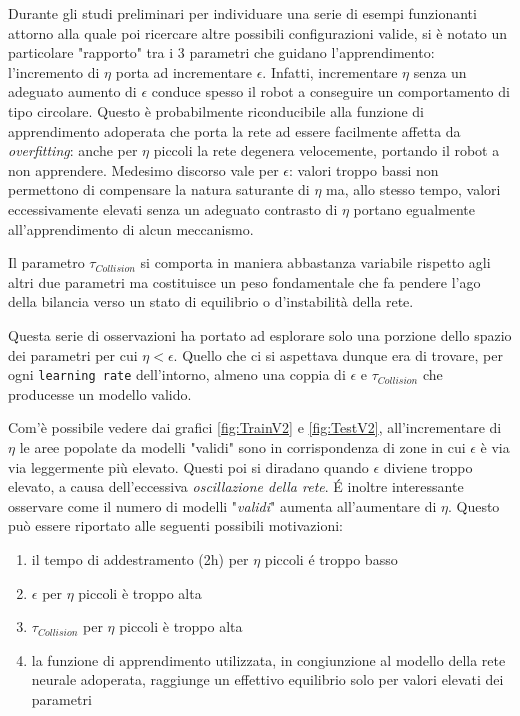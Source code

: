 Durante gli studi preliminari per individuare una serie di esempi funzionanti attorno alla quale poi ricercare altre possibili configurazioni valide, si è notato un particolare "rapporto" tra i 3 parametri che guidano l'apprendimento: l'incremento di $\eta$ porta ad incrementare $\epsilon$.
Infatti, incrementare $\eta$ senza un adeguato aumento di $\epsilon$ conduce spesso il robot a conseguire un comportamento di tipo circolare. Questo è probabilmente riconducibile alla funzione di apprendimento adoperata che porta la rete ad essere facilmente affetta da \textit{overfitting}: anche per $\eta$ piccoli la rete degenera velocemente, portando il robot a non apprendere. Medesimo discorso vale per $\epsilon$: valori troppo bassi non permettono di compensare la natura saturante di $\eta$ ma, allo stesso tempo, valori eccessivamente elevati senza un adeguato contrasto di $\eta$ portano egualmente all'apprendimento di alcun meccanismo.

Il parametro $\tau_{Collision}$ si comporta in maniera abbastanza variabile rispetto agli altri due parametri ma costituisce un peso fondamentale che fa pendere l'ago della bilancia verso un stato di equilibrio o d'instabilità della rete. 

Questa serie di osservazioni ha portato ad esplorare solo una porzione dello spazio dei parametri per cui $\eta < \epsilon$. Quello che ci si aspettava dunque era di trovare, per ogni \texttt{learning rate} dell'intorno, almeno una coppia di $\epsilon$ e $\tau_{Collision}$ che producesse un modello valido. 

Com'è possibile vedere dai grafici \ref{fig:TrainV2} e \ref{fig:TestV2}, all'incrementare di $\eta$ le aree popolate da modelli "validi" sono in corrispondenza di zone in cui $\epsilon$ è via via leggermente più elevato. Questi poi si diradano quando $\epsilon$ diviene troppo elevato, a causa dell'eccessiva \textit{oscillazione della rete}. É inoltre interessante osservare come il numero di modelli "\textit{validi}" aumenta all'aumentare di $\eta$. Questo può essere riportato alle seguenti possibili motivazioni: 

\begin{enumerate}
    \item il tempo di addestramento (2h) per $\eta$ piccoli é troppo basso 
    \item $\epsilon$ per $\eta$ piccoli è troppo alta
    \item $\tau_{Collision}$ per $\eta$ piccoli è troppo alta
    \item la funzione di apprendimento utilizzata, in congiunzione al modello della rete neurale adoperata, raggiunge un effettivo equilibrio solo per valori elevati dei parametri
\end{enumerate} 

